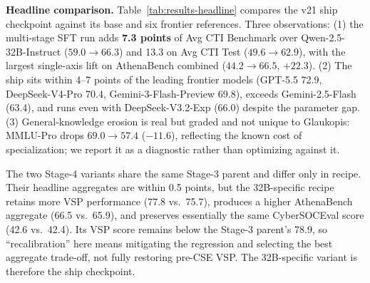 \documentclass[conference]{IEEEtran}
\begin{document}
\textbf{Headline comparison.} Table~\ref{tab:results-headline} compares the v21 ship checkpoint against its base and six frontier references. Three observations: (1) the multi-stage SFT run adds \textbf{7.3 points} of Avg CTI Benchmark over Qwen-2.5-32B-Instruct ($59.0\to66.3$) and 13.3 on Avg CTI Test ($49.6\to62.9$), with the largest single-axis lift on AthenaBench combined ($44.2\to66.5$, $+22.3$). (2) The ship sits within 4--7 points of the leading frontier models (GPT-5.5 72.9, DeepSeek-V4-Pro 70.4, Gemini-3-Flash-Preview 69.8), exceeds Gemini-2.5-Flash (63.4), and runs even with DeepSeek-V3.2-Exp (66.0) despite the parameter gap. (3) General-knowledge erosion is real but graded and not unique to Glaukopis: MMLU-Pro drops $69.0\to57.4$ ($-11.6$), reflecting the known cost of specialization; we report it as a diagnostic rather than optimizing against it.

The two Stage-4 variants share the same Stage-3 parent and differ only in recipe. Their headline aggregates are within 0.5 points, but the 32B-specific recipe retains more VSP performance (77.8 vs.\ 75.7), produces a higher AthenaBench aggregate (66.5 vs.\ 65.9), and preserves essentially the same CyberSOCEval score (42.6 vs.\ 42.4). Its VSP score remains below the Stage-3 parent's 78.9, so ``recalibration'' here means mitigating the regression and selecting the best aggregate trade-off, not fully restoring pre-CSE VSP. The 32B-specific variant is therefore the ship checkpoint.
\end{document}
